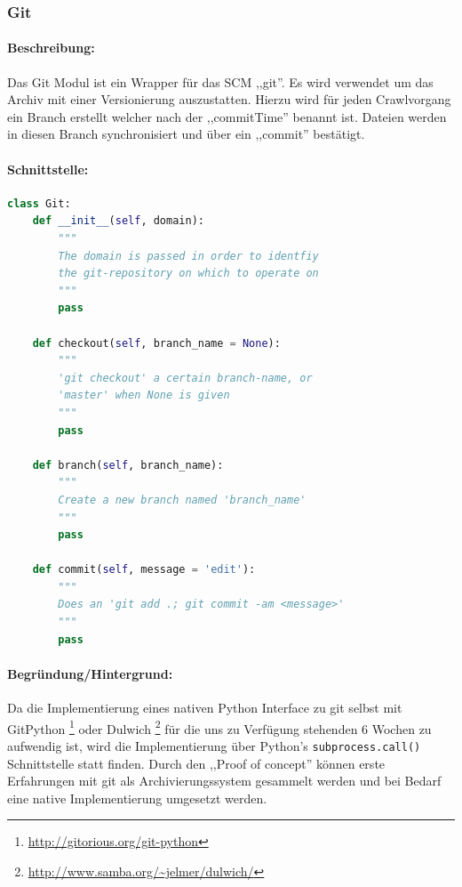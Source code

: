 
\subsubsection{Git}
\label{ssub:git}
\paragraph{Beschreibung:}
\label{par:beschreibung_}
Das Git Modul ist ein Wrapper für das SCM ,,git''. Es wird verwendet um das Archiv mit einer Versionierung auszustatten. Hierzu wird für jeden Crawlvorgang ein Branch erstellt welcher nach der ,,commitTime'' benannt ist. 
Dateien werden in diesen Branch synchronisiert und über ein ,,commit'' bestätigt.

\paragraph{Schnittstelle:}
\label{par:schnittstelle_}
\hfill
\begin{lstlisting}[language=python]
class Git:
    def __init__(self, domain):
        """
        The domain is passed in order to identfiy
        the git-repository on which to operate on
        """
        pass

    def checkout(self, branch_name = None):
        """
        'git checkout' a certain branch-name, or 
        'master' when None is given
        """
        pass

    def branch(self, branch_name):
        """
        Create a new branch named 'branch_name'
        """
        pass

    def commit(self, message = 'edit'):
        """
        Does an 'git add .; git commit -am <message>'
        """
        pass
\end{lstlisting}

\paragraph{Begründung/Hintergrund:}
\label{par:begr_ndung_hintergrund_}
Da die Implementierung eines nativen Python Interface zu git selbst mit GitPython
\footnote{\url{http://gitorious.org/git-python}} oder Dulwich \footnote{\url{http://www.samba.org/~jelmer/dulwich/}}
für die uns zu Verfügung stehenden 6 Wochen zu aufwendig ist, wird die Implementierung über
Python's \texttt{subprocess.call()} Schnittstelle statt finden. Durch den ,,Proof of concept'' können
erste Erfahrungen mit git als Archivierungssystem gesammelt werden und bei Bedarf eine native Implementierung
umgesetzt werden.


